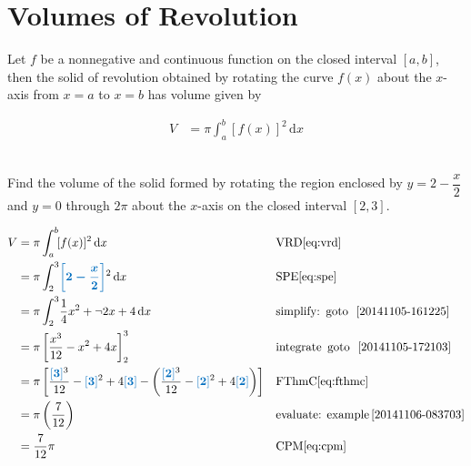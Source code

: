 
\section{Volumes of Revolution}

\begin{definition}
Let $f$ be a nonnegative and continuous function on the closed interval $[a,b]$, then the solid of revolution obtained by rotating the curve $f(x)$ about the $x$-axis from $x=a$ to $x=b$ has volume given by

\begin{align}
V & =\pi \displaystyle \int_{a}^{b} \! [f(x)]^2 \, \mathrm{d} x \label{eq:vrd}
\end{align}	
\end{definition}

\begin{example}[id:20141105-144223]\label{20141105-144223}  \hfill \\
	
Find the volume of the solid formed by rotating the region enclosed by $y=2-\dfrac{x}{2}$ and $y=0$ through $2\pi$ about the $x$-axis on the closed interval $[2, 3]$. 

\soln

\solnsteps
\begin{align*}
V & =\pi \displaystyle \int_{a}^{b} \! [f(x)]^2 \, \mathrm{d} x &&\text{VRD}\eqref{eq:vrd} \\
  & =\pi \displaystyle \int_{2}^{3} \! \farg{2-\dfrac{x}{2}}^2 \, \mathrm{d} x && \text{SPE} \eqref{eq:spe} \\
  &= \pi \displaystyle \int_{2}^{3} \! \dfrac{1}{4} x^2 + \neg 2 x + 4 \, \mathrm{d} x && \text{simplify:} \text{\, goto \,} \, \ref{20141105-161225} \\
  &= \pi \left[ \dfrac{x^3}{12} - x^2 + 4x\right]_{2}^{3} && \text{integrate} \text{\, goto \,} \, \ref{20141105-172103} \\
  &= \pi \left[\dfrac{\farg{3}^3}{12} - \farg{3}^2 + 4\farg{3}- \left(\dfrac{\farg{2}^3}{12} - \farg{2}^2 + 4\farg{2} \right) \right] && \text{FThmC} \eqref{eq:fthmc} \\
  &= \pi \left(\dfrac{7}{12}\right)  &&\text{evaluate: example} \, \ref{20141106-083703} \\
  &= \dfrac{7}{12} \pi && \text{CPM} \eqref{eq:cpm}
\end{align*}


\end{example}

